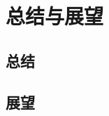
\chapter{总结与展望}
\label{cha:conclusion}

\section{总结}
\label{sec:conslusion}

\section{展望}
\label{sec:future_work}
